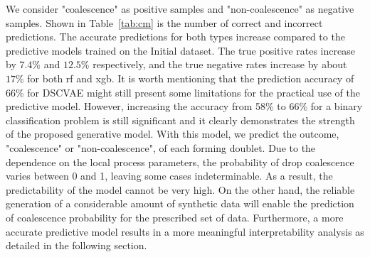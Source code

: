 \documentclass[twoside,twocolumn,9pt]{article}
\begin{document}
We consider "coalescence" as positive samples and "non-coalescence" as negative samples. Shown in Table~\ref{tab:cm} is the number of correct and incorrect predictions. The accurate predictions for both types increase compared to the predictive models trained on the Initial dataset. The true positive rates increase by $7.4\%$ and $12.5\%$ respectively, and the true negative rates increase by about $17\%$ for both \acrshort*{rf} and \acrlong*{xgb}. It is worth mentioning that the prediction accuracy of 66\% for DSCVAE might still present some limitations for the practical use of the predictive model. However, increasing the accuracy from 58\% to 66\% for a binary classification problem is still significant and it clearly demonstrates the strength of the proposed generative model. With this model, we predict the outcome, "coalescence" or "non-coalescence", of each forming doublet. Due to the dependence on the local process parameters, the probability of drop coalescence varies between 0 and 1, leaving some cases indeterminable. As a result, the predictability of the model cannot be very high. On the other hand, the reliable generation of a considerable amount of synthetic data will enable the prediction of coalescence probability for the prescribed set of data. Furthermore, a more accurate predictive model results in a more meaningful interpretability analysis as detailed in the following section.
\end{document}
